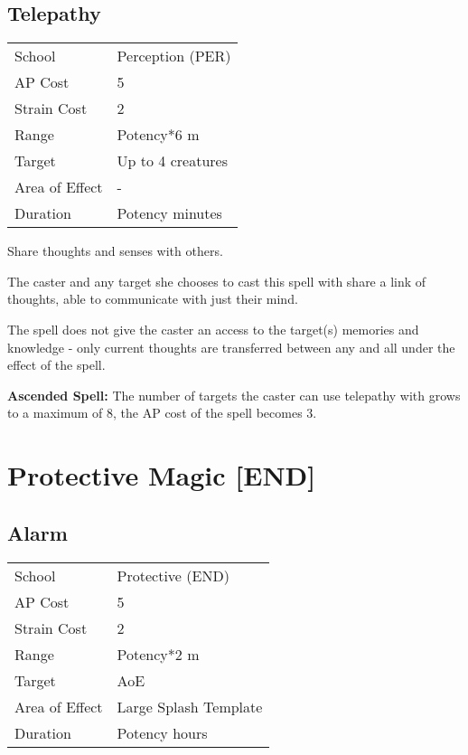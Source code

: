 \documentclass[11pt,a4paper,twocolumn]{book}
\begin{document}

\subsection*{Telepathy}
{
	\begin{tabu} to 75mm{| X[l,4] | X[l,7] |}
		\hline
		School 			& Perception (PER) 				\\
		AP Cost	      	& 5								\\
		Strain Cost     & 2 							\\
		Range     		& Potency*6 m					\\
		Target      	& Up to 4 creatures				\\
		Area of Effect  & - 	 						\\
		Duration     	& Potency minutes				\\ \hline
	\end{tabu}
	
}

\medskip

Share thoughts and senses with others.

The caster and any target she chooses to cast this spell with share a link of thoughts, able to communicate with just their mind.

The spell does not give the caster an access to the target(s) memories and knowledge - only current thoughts are transferred between any and all under the effect of the spell.

\bigskip

\textbf{Ascended Spell:} The number of targets the caster can use telepathy with grows to a maximum of 8, the AP cost of the spell becomes 3.

\vfill

\section*{Protective Magic [END]}

\subsection*{Alarm}
{
	\begin{tabu} to 75mm{| X[l,4] | X[l,7] |}
		\hline
		School 			& Protective (END) 	\\
		AP Cost	      	& 5 				\\
		Strain Cost     & 2 				\\
		Range     		& Potency*2 m 		\\
		Target      	& AoE 				\\
		Area of Effect  & Large Splash Template 	\\
		Duration     	& Potency hours 	\\ \hline
	\end{tabu}
	
}
\end{document}
